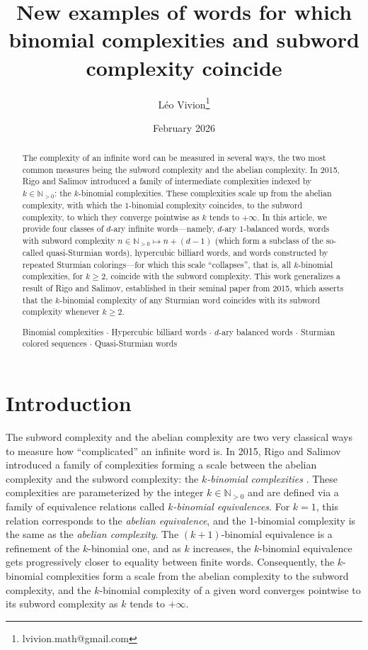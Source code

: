 \documentclass{template_arxiv}
\title{New examples of words for which binomial complexities and subword complexity coincide}
\author[1]{L\'eo Vivion\thanks{lvivion.math@gmail.com}}
\affil[1]{Laboratoire de Math\'ematiques Pures et Appliqu\'ees Joseph Liouville, Universit\'e du Littoral C\^ote d'Opale, UR 2597, F-62100 Calais, France.}
\date{February 2026}
\theoremstyle{definition}
\newcommand{\N}{\mathbb{N}}
\begin{document}
\maketitle

\begin{abstract}
The complexity of an infinite word can be measured in several ways, the two most common measures being the subword complexity and the abelian complexity. In 2015, Rigo and Salimov introduced a family of intermediate complexities indexed by $k\in\mathbb{N}_{>0}$: the $k$-binomial complexities. These complexities scale up from the abelian complexity, with which the $1$-binomial complexity coincides, to the subword complexity, to which they converge pointwise as $k$ tends to $+\infty$. In this article, we provide four classes of $d$-ary infinite words---namely, $d$-ary $1$-balanced words, words with subword complexity $n\in\mathbb{N}_{>0}\mapsto n+(d-1)$ (which form a subclass of the so-called quasi-Sturmian words), hypercubic billiard words, and words constructed by repeated Sturmian colorings---for which this scale ``collapses'', that is, all $k$-binomial complexities, for $k\geq 2$, coincide with the subword complexity. This work generalizes a result of Rigo and Salimov, established in their seminal paper from 2015, which asserts that the $k$-binomial complexity of any Sturmian word coincides with its subword complexity whenever $k\geq 2$.

\vspace*{.5cm}
 Binomial complexities $\bm{\cdot}$ Hypercubic billiard words $\bm{\cdot}$ $d$-ary balanced words $\bm{\cdot}$ Sturmian colored sequences $\bm{\cdot}$ Quasi-Sturmian words
\end{abstract}

%
%

\section{Introduction}

The subword complexity and the abelian complexity are two very classical ways to measure how ``complicated'' an infinite word is. In 2015, Rigo and Salimov introduced a family of complexities forming a scale between the abelian complexity and the subword complexity: the \emph{$k$-binomial complexities} \cite{RS15}. These complexities are parameterized by the integer $k\in\N_{>0}$ and are defined via a family of equivalence relations called \emph{$k$-binomial equivalences}. For $k=1$, this relation corresponds to the \emph{abelian equivalence}, and the $1$-binomial complexity is the same as the \emph{abelian complexity}. The $(k+1)$-binomial equivalence is a refinement of the $k$-binomial one, and as $k$ increases, the $k$-binomial equivalence gets progressively closer to equality between finite words. Consequently, the $k$-binomial complexities form a scale from the abelian complexity to the subword complexity, and the $k$-binomial complexity of a given word converges pointwise to its subword complexity as $k$ tends to $+\infty$.
\end{document}
